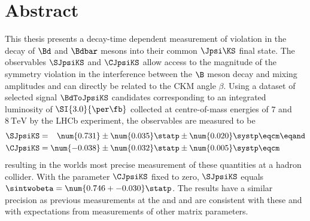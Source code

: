 \clearpage
\thispagestyle{empty}

\vspace{2ex}
\section*{Abstract}
This thesis presents a decay-time dependent measurement of \CP violation in the
decay of $\Bd$ and $\Bdbar$ mesons into their common $\Jpsi\KS$ final state. The
\CP observables $\SJpsiKS$ and $\CJpsiKS$ allow access to the magnitude of the
symmetry violation in the interference between the $\B$ meson decay and mixing
amplitudes and can directly be related to the \acs{CKM} angle $\beta$. Using a
dataset of selected signal $\BdToJpsiKS$ candidates corresponding to an
integrated luminosity of $\SI{3.0}{\per\fb}$ collected at centre-of-mass
energies of $\num{7}$ and $\SI{8}{\TeV}$ by the \acs{LHCb} experiment, the \CP
observables are measured to be
%
\begin{equation*}
  \begin{split}
    \SJpsiKS &= \phantom{-}\num{0.731} \pm \num{0.035} \statp \pm \num{0.020} \systp \eqcm\eqand \\
    \CJpsiKS &=           \num{-0.038} \pm \num{0.032} \statp \pm \num{0.005} \systp \eqcm
  \end{split}
\end{equation*}
%
resulting in the worlds most precise measurement of these quantities at a hadron
collider. With the parameter $\CJpsiKS$ fixed to zero, $\SJpsiKS$ equals
$\sintwobeta = \num{0.746 +- 0.030}\statp$. The results have a similar precision
as previous measurements at the \BFactories \Babar and \Belle and are consistent
with these and with expectations from measurements of other \CKM matrix parameters.


